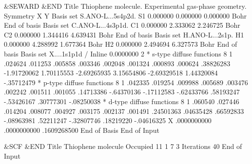 \begin{inputlisting}
 &SEWARD &END                                                                   
Title                                                                           
Thiophene molecule. Experimental gas-phase geometry.                                            
Symmetry                                                                        
 X Y                                                                          
Basis set                                                                       
S.ANO-L...5s4p2d.
S1    0.000000  0.000000  0.000000  Bohr
End of basis
Basis set
C.ANO-L...4s3p1d.
C1    0.000000  2.333062  2.246725  Bohr
C2    0.000000  1.344416  4.639431  Bohr
End of basis
Basis set
H.ANO-L...2s1p.
H1    0.000000  4.288992  1.677364  Bohr
H2    0.000000  2.494694  6.327573  Bohr
End of basis                                                                    
Basis set
X....1s1p1d / Inline
 0.0000000 2
*  s-type diffuse functions 
    8    1
 .024624 .011253 .005858 .003346 .002048 .001324 .000893 .000624
  .38826283 
-1.91720062 
 1.70115553 
-2.69265935 
 3.15654806 
-2.69329518 
 1.44320084 
 -.35712479   
*  p-type diffuse functions 
    8    1
 .042335 .019254 .009988 .005689 .003476 .002242 .001511 .001055
  .14713386 
 -.64370136 
 -.17112583 
 -.62433766 
  .58193247 
 -.53426167 
  .30777301
 -.08250038
*  d-type diffuse functions 
    8    1
 .060540 .027446 .014204 .008077 .004927 .003175 .002137 .001491
  .24501363
  .04635428
  .66592833
 -.08963981
  .52211247
 -.32807746
  .18219220
 -.04616325
X               .0000000000         .0000000000         .1609268500  
End of Basis
End of Input                                                                    

 &SCF &END                                                                      
Title                                                                           
 Thiophene molecule                                                         
Occupied                                                                        
11 1 7 3                                                                     
Iterations                                                                      
40                                                                              
End of Input                                                                    


\end{inputlisting}
